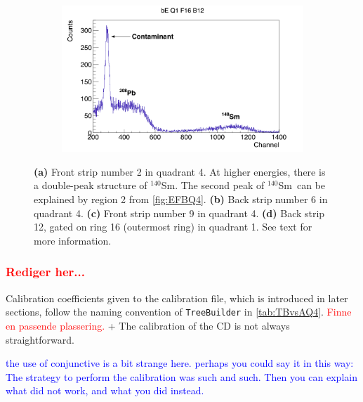 \documentclass[twoside,english]{uiofysmaster/uiofysmaster}
\newcommand{\Sm}{$^{140}$Sm} %
\let\orgautoref\autoref
\renewcommand{\autoref}
        {%
		 \def\sectionautorefname{Section}%
		 \def\subsectionautorefname{Section}%
		 \def\subsubsectionautorefname{Section}%
		 \def\chapterautorefname{Chapter}%
          \orgautoref}
\begin{document}
\begin{figure}[ht]
\begin{subfigure}[t]{0.49\textwidth}
		\caption{}
		\label{fig:CD_cal_easy}
	\end{subfigure}
	\hfill
	\begin{subfigure}[t]{0.49\textwidth}
		\centering
		\includegraphics[width=\textwidth]{../Plots/plotting/bE_Q1_f16_b12.png}
		\caption{}
		\label{fig:CD_cal_difficult}
	\end{subfigure}
	\caption{\textbf{(a)} Front strip number 2 in quadrant 4. 
	At higher energies, there is a double-peak structure of \Sm. 
	The second peak of \Sm\ can be explained by region 2 from \autoref{fig:EFBQ4}.
	\textbf{(b)} Back strip number 6 in quadrant 4.
	\textbf{(c)} Front strip number 9 in quadrant 4. 
	\textbf{(d)} Back strip 12, gated on ring 16 (outermost ring) in quadrant 1. 
	See text for more information.}
	\label{fig:cal_ED}
\end{figure}

\subsubsection*{\textcolor{red}{Rediger her...}}
Calibration coefficients given to the calibration file, which is introduced in later sections, follow the naming convention of \texttt{TreeBuilder} in \autoref{tab:TBvsAQ4}. 
\textcolor{red}{Finne en passende plassering.} + The calibration of the CD is not always straightforward.



\bigskip

\textcolor{blue}{the use of conjunctive is a bit strange here. perhaps you could say it in this way: The strategy to perform the calibration was such and such. Then you can explain what did not work, and what you did instead.}
\end{document}
